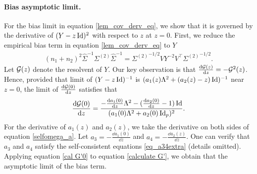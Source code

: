 \paragraph{Bias asymptotic limit.}
For the bias limit in equation \eqref{lem_cov_derv_eq}, we show that it is governed by the derivative of $(Y - z\id)^2$ with respect to $z$ at $z = 0$.
First, we reduce the empirical bias term in equation \eqref{lem_cov_derv_eq} to $Y$
\begin{align}\label{calculate G'}
	(n_1 + n_2)^2 \hat{\Sigma}^{-1}\Sigma^{(2)}\hat{\Sigma}^{-1} = {\Sigma^{(2)}}^{-1/2} V Y^{-2} V^{\top} {\Sigma^{(2)}}^{-1/2}.
\end{align}
Let $\cal G(z)$ denote the resolvent of $Y$.
Our key observation is that $\frac{\dd{\cal G(z)}}{\dd z} = - \cal G^2(z)$.
Hence, provided that limit of $(Y - z\id)^{-1}$ is $(a_1(z) \Lambda^2 + (a_2(z) - z) \id)^{-1}$ near $z = 0$, the limit of $\frac{\dd{\cal G(0)}}{\dd z}$ satisfies that
\begin{align}\label{cal G'0}
	\frac{\dd \cal G(0)}{\dd z} = \frac{-\frac{\dd a_1(0)}{\dd z}\Lambda^2 - (\frac{\dd a_2(0)}{\dd z} - 1)\id}{(a_{1}(0)\Lambda^2 + a_{2}(0)\id_p)^2}.
\end{align}
For the derivative of $a_1(z)$ and $a_2(z)$, we take the derivative on both sides of equation \eqref{selfomega_a}.
Let $a_3 = - \frac{\dd a_1(0)}{\dd z}$ and $a_4 = - \frac{\dd a_2(z)}{\dd z}$.
One can verify that $a_3$ and $a_4$ satisfy the self-consistent equations \eqref{eq_a34extra} (details omitted).
Applying equation \eqref{cal G'0} to equation \eqref{calculate G'}, we obtain that the asymptotic limit of the bias term.

